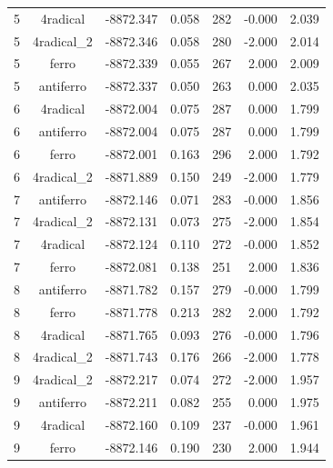 \begin{longtable}{@{}ccrrrrr@{}}
\rowcolor{gray!20} 5 & 4radical & -8872.347 & 0.058 & 282 & -0.000 & 2.039 \\
5 & 4radical\_2 & -8872.346 & 0.058 & 280 & -2.000 & 2.014 \\
5 & ferro & -8872.339 & 0.055 & 267 & 2.000 & 2.009 \\
5 & antiferro & -8872.337 & 0.050 & 263 & 0.000 & 2.035 \\
\rowcolor{gray!20} 6 & 4radical & -8872.004 & 0.075 & 287 & 0.000 & 1.799 \\
6 & antiferro & -8872.004 & 0.075 & 287 & 0.000 & 1.799 \\
6 & ferro & -8872.001 & 0.163 & 296 & 2.000 & 1.792 \\
6 & 4radical\_2 & -8871.889 & 0.150 & 249 & -2.000 & 1.779 \\
\rowcolor{gray!20} 7 & antiferro & -8872.146 & 0.071 & 283 & -0.000 & 1.856 \\
7 & 4radical\_2 & -8872.131 & 0.073 & 275 & -2.000 & 1.854 \\
7 & 4radical & -8872.124 & 0.110 & 272 & -0.000 & 1.852 \\
7 & ferro & -8872.081 & 0.138 & 251 & 2.000 & 1.836 \\
\rowcolor{gray!20} 8 & antiferro & -8871.782 & 0.157 & 279 & -0.000 & 1.799 \\
8 & ferro & -8871.778 & 0.213 & 282 & 2.000 & 1.792 \\
8 & 4radical & -8871.765 & 0.093 & 276 & -0.000 & 1.796 \\
8 & 4radical\_2 & -8871.743 & 0.176 & 266 & -2.000 & 1.778 \\
\rowcolor{gray!20} 9 & 4radical\_2 & -8872.217 & 0.074 & 272 & -2.000 & 1.957 \\
9 & antiferro & -8872.211 & 0.082 & 255 & 0.000 & 1.975 \\
9 & 4radical & -8872.160 & 0.109 & 237 & -0.000 & 1.961 \\
9 & ferro & -8872.146 & 0.190 & 230 & 2.000 & 1.944 \\
\end{longtable}